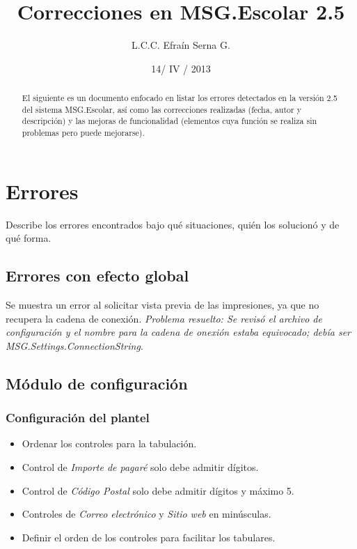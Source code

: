 \documentclass[12pt,spanish,twocolumn]{article}
\title{Correcciones en MSG.Escolar 2.5}
\author{L.C.C. Efra\'in Serna G.}
\date{14/ IV / 2013}
\begin{document}
\maketitle

\begin{abstract}
El siguiente es un documento enfocado en listar los errores detectados en la versi\'on 2.5 del sistema MSG.Escolar, así como las correcciones realizadas (fecha, autor y descripci\'on) y las mejoras de funcionalidad (elementos cuya funci\'on se realiza sin problemas pero puede mejorarse).
\end{abstract}

\section{Errores}
Describe los errores encontrados bajo qu\'e situaciones, qui\'en los solucion\'o y de qu\'e forma.\\

\subsection{Errores con efecto global}
Se muestra un error al solicitar vista previa de las impresiones, ya que no recupera la cadena de conexi\'on. \emph{Problema resuelto: Se revis\'o el archivo de configuraci\'on y el nombre para la cadena de onexi\'on estaba equivocado; deb\'ia ser \emph{MSG.Settings.ConnectionString}}.

\subsection{M\'odulo de configuraci\'on}

\subsubsection{Configuraci\'on del plantel}
\begin{itemize}
\item Ordenar los controles para la tabulaci\'on.
\item Control de \emph{Importe de pagar\'e} solo debe admitir d\'igitos.
\item Control de \emph{C\'odigo Postal} solo debe admitir d\'igitos y m\'aximo 5.
\item Controles de \emph{Correo electr\'onico} y \emph{Sitio web} en min\'usculas.
\item Definir el orden de los controles para facilitar los tabulares.
\end{itemize}
\end{document}
